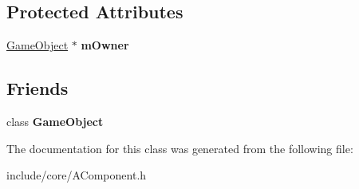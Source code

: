 \subsection*{\-Protected \-Attributes}
\begin{DoxyCompactItemize}
\item 
\hypertarget{classde_1_1_a_component_a068c136424815a8b7b2026a5c4787de0}{
\hyperlink{classde_1_1_game_object}{\-Game\-Object} $\ast$ {\bfseries m\-Owner}}
\label{classde_1_1_a_component_a068c136424815a8b7b2026a5c4787de0}

\end{DoxyCompactItemize}
\subsection*{\-Friends}
\begin{DoxyCompactItemize}
\item 
\hypertarget{classde_1_1_a_component_a00df87c957d8f7ee0fc51f07a0542f4a}{
class {\bfseries \-Game\-Object}}
\label{classde_1_1_a_component_a00df87c957d8f7ee0fc51f07a0542f4a}

\end{DoxyCompactItemize}


\-The documentation for this class was generated from the following file\-:\begin{DoxyCompactItemize}
\item 
include/core/\-A\-Component.\-h\end{DoxyCompactItemize}
